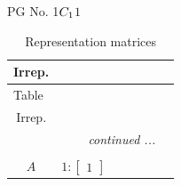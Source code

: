 \documentclass[fleqn,8pt,landscape]{jsarticle}
\begin{document}
\setcounter{MaxMatrixCols}{32}

\renewcommand{\tablename}{Table~}
\renewcommand{\figurename}{Figure~}
\begin{center}
\LARGE
PG No. 1\quad$C_{\rm 1}$\quad$1$\quad[ triclinic ]
\end{center}
\renewcommand{\arraystretch}{1.2}
\begin{longtable}{ccccccc}
\caption{Representation matrices}
 \\
 \hline \hline
Irrep. &  &  &  &  &  &  \\ \hline \endfirsthead

\multicolumn{6}{l}{\tablename\ \thetable{}} \\
 \hline \hline
Irrep. &  &  &  &  &  &  \\ \hline \endhead

 \hline \hline
\multicolumn{6}{r}{\footnotesize\it continued ...} \\ \endfoot

 \hline \hline
\multicolumn{6}{r}{} \\ \endlastfoot

$ A $ & $ 1:\begin{bmatrix} 1 \end{bmatrix} $ \\
\end{longtable}
\end{document}
